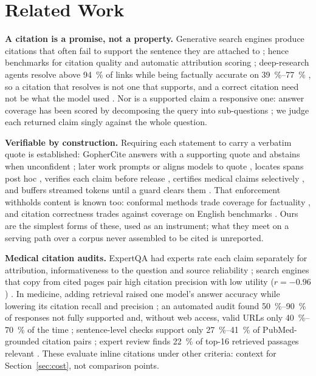\documentclass[conference,a4paper]{IEEEtran}
\begin{document}
\section{Related Work}\label{sec:related}
\textbf{A citation is a promise, not a property.} Generative search engines produce citations
that often fail to support the sentence they are attached to \cite{liu2023verifiability};
hence benchmarks for citation quality \cite{gao2023alce} and automatic attribution scoring
\cite{yue2023attrscore}; deep-research agents resolve above \SI{94}{\percent} of links while
being factually accurate on \SIrange{39}{77}{\percent} \cite{onweller2026citednotverified}, so
a citation that resolves is not one that supports, and a correct citation need not be what the
model used \cite{wallat2025correctness}. Nor is a supported claim a responsive one:
answer coverage has been scored by decomposing the query into sub-questions
\cite{xie2025subquestion}; we judge each returned claim singly against the whole question.

\textbf{Verifiable by construction.} Requiring each statement to carry a verbatim quote is
established: GopherCite answers with a supporting quote and abstains when unconfident
\cite{menick2022gophercite}; later work prompts or aligns models to quote
\cite{weller2024according,zhang2024quotetuning}, locates spans post hoc
\cite{yeginbergen2026fullcite}, verifies each claim before release \cite{qian2025vericite},
certifies medical claims selectively \cite{kan2026claimselective}, and buffers streamed tokens
until a guard clears them \cite{sentguard2026}. That enforcement withholds content is known
too: conformal methods trade coverage for factuality \cite{mohri2024conformal}, and citation
correctness trades against coverage on English benchmarks \cite{saxena2025coverage}. Ours are
the simplest forms of these, used as an instrument; what they meet on a serving path over a
corpus never assembled to be cited is unreported.

\textbf{Medical citation audits.} ExpertQA had experts rate each claim separately for
attribution, informativeness to the question and source reliability
\cite{malaviya2024expertqa}; search engines that copy from cited pages pair high citation
precision with low utility ($r=-0.96$) \cite{liu2023verifiability}. In medicine, adding
retrieval raised one model's answer accuracy while lowering its citation recall and precision
\cite{wang2025medcite}; an automated audit found \SIrange{50}{90}{\percent} of responses not
fully supported and, without web access, valid URLs only \SIrange{40}{70}{\percent} of the
time \cite{wu2025sourcecheckup}; sentence-level checks support only \SIrange{27}{41}{\percent}
of PubMed-grounded citation pairs \cite{ma2026vericite}; expert review finds
\SI{22}{\percent} of top-16 retrieved passages relevant \cite{kim2025rethinkingmedrag}. These
evaluate inline citations under other criteria: context for Section~\ref{sec:cost}, not
comparison points.
\end{document}
